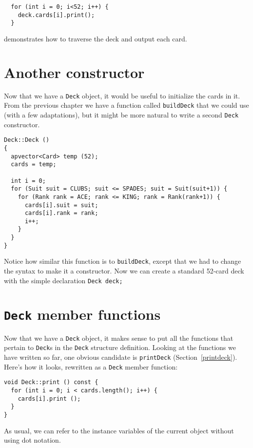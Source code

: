 \begin{verbatim}
  for (int i = 0; i<52; i++) {
    deck.cards[i].print();
  }
\end{verbatim}
%
demonstrates how to traverse the deck and output each card.

\section {Another constructor}

Now that we have a {\tt Deck} object, it would be useful
to initialize the cards in it.  From the previous chapter we
have a function called {\tt buildDeck} that we could use
(with a few adaptations), but it might be more natural to
write a second {\tt Deck} constructor.


\begin{verbatim}
Deck::Deck ()
{
  apvector<Card> temp (52);
  cards = temp;

  int i = 0;
  for (Suit suit = CLUBS; suit <= SPADES; suit = Suit(suit+1)) {
    for (Rank rank = ACE; rank <= KING; rank = Rank(rank+1)) {
      cards[i].suit = suit;
      cards[i].rank = rank;
      i++;
    }
  }
}
\end{verbatim}
%
Notice how similar this function is to {\tt buildDeck}, except
that we had to change the syntax to make it a constructor.
Now we can create a standard 52-card deck with the simple
declaration {\tt Deck deck;}

\section {{\tt Deck} member functions}

Now that we have a {\tt Deck} object, it makes sense to put
all the functions that pertain to {\tt Deck}s in the {\tt Deck}
structure definition.  Looking at the functions we have written so
far, one obvious candidate is {\tt printDeck} (Section~\ref{printdeck}).
Here's how it looks, rewritten as a {\tt Deck} member function:


\begin{verbatim}
void Deck::print () const {
  for (int i = 0; i < cards.length(); i++) {
    cards[i].print ();
  }
}
\end{verbatim}
%
As usual, we can refer to the instance variables of the current
object without using dot notation.

